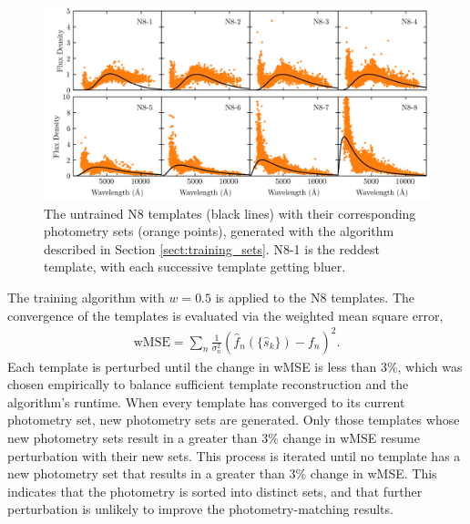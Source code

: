 \documentclass[twocolumn]{aastex63}
\begin{document}
    \begin{figure}
        \centering
        \includegraphics{N8_untrained.png}
        \caption{The untrained N8 templates (black lines) with their corresponding photometry sets (orange points), generated with the algorithm described in Section \ref{sect:training_sets}. N8-1 is the reddest template, with each successive template getting bluer.}
        \label{fig:N8_untrained}
    \end{figure}

    The training algorithm with $w=0.5$ is applied to the N8 templates.
    The convergence of the templates is evaluated via the weighted mean square error,
    \begin{align}
        \text{wMSE} = \sum_n \frac{1}{\sigma_n^2}(\hat{f}_n(\{\hat{s}_k\}) - f_n)^2.
    \end{align}
    Each template is perturbed until the change in wMSE is less than 3\%, which was chosen empirically to balance sufficient template reconstruction and the algorithm's runtime.
    When every template has converged to its current photometry set, new photometry sets are generated.
    Only those templates whose new photometry sets result in a greater than 3\% change in wMSE resume perturbation with their new sets.
    This process is iterated until no template has a new photometry set that results in a greater than 3\% change in wMSE.
    This indicates that the photometry is sorted into distinct sets, and that further perturbation is unlikely to improve the photometry-matching results.
\end{document}
